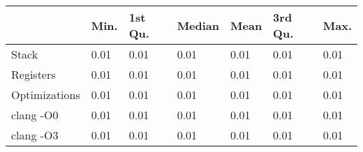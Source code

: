 \begin{table}[ht]
\centering
\begin{tabular}{p{}p{}p{}p{}p{}p{}p{}}
  \hline
 & Min. & 1st Qu. & Median & Mean & 3rd Qu. & Max. \\ 
  \hline
Stack & 0.01 & 0.01 & 0.01 & 0.01 & 0.01 & 0.01 \\ 
  Registers & 0.01 & 0.01 & 0.01 & 0.01 & 0.01 & 0.01 \\ 
  Optimizations & 0.01 & 0.01 & 0.01 & 0.01 & 0.01 & 0.01 \\ 
  clang -O0 & 0.01 & 0.01 & 0.01 & 0.01 & 0.01 & 0.01 \\ 
  clang -O3 & 0.01 & 0.01 & 0.01 & 0.01 & 0.01 & 0.01 \\ 
   \hline
\end{tabular}
\end{table}
